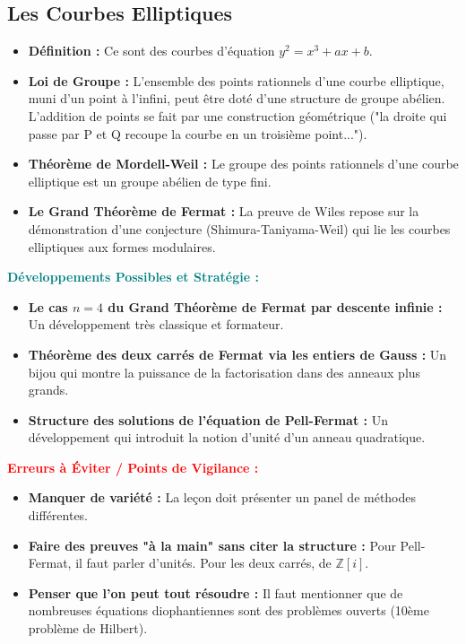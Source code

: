 \documentclass[12pt, a4paper, parskip=full]{report}
\theoremstyle{agregstyle}
\newenvironment{developpements}
  {\par\medskip\noindent\begin{oframed}\noindent\textbf{\textcolor{teal}{Développements Possibles et Stratégie :}}}
  {\end{oframed}\par\medskip}
\newenvironment{erreurs}
  {\par\medskip\noindent\begin{oframed}\noindent\textbf{\textcolor{red}{Erreurs à Éviter / Points de Vigilance :}}}
  {\end{oframed}\par\medskip}
\begin{document}
\subsection{Les Courbes Elliptiques}
\begin{itemize}
    \item \textbf{Définition :} Ce sont des courbes d'équation $y^2 = x^3+ax+b$.
    \item \textbf{Loi de Groupe :} L'ensemble des points rationnels d'une courbe elliptique, muni d'un point à l'infini, peut être doté d'une structure de groupe abélien. L'addition de points se fait par une construction géométrique ("la droite qui passe par P et Q recoupe la courbe en un troisième point...").
    \item \textbf{Théorème de Mordell-Weil :} Le groupe des points rationnels d'une courbe elliptique est un groupe abélien de type fini.
    \item \textbf{Le Grand Théorème de Fermat :} La preuve de Wiles repose sur la démonstration d'une conjecture (Shimura-Taniyama-Weil) qui lie les courbes elliptiques aux formes modulaires.
\end{itemize}

\begin{developpements}
    \begin{itemize}
        \item \textbf{Le cas $n=4$ du Grand Théorème de Fermat par descente infinie :} Un développement très classique et formateur.
        \item \textbf{Théorème des deux carrés de Fermat via les entiers de Gauss :} Un bijou qui montre la puissance de la factorisation dans des anneaux plus grands.
        \item \textbf{Structure des solutions de l'équation de Pell-Fermat :} Un développement qui introduit la notion d'unité d'un anneau quadratique.
    \end{itemize}
\end{developpements}

\begin{erreurs}
    \begin{itemize}
        \item \textbf{Manquer de variété :} La leçon doit présenter un panel de méthodes différentes.
        \item \textbf{Faire des preuves "à la main" sans citer la structure :} Pour Pell-Fermat, il faut parler d'unités. Pour les deux carrés, de $\mathbb{Z}[i]$.
        \item \textbf{Penser que l'on peut tout résoudre :} Il faut mentionner que de nombreuses équations diophantiennes sont des problèmes ouverts (10ème problème de Hilbert).
    \end{itemize}
\end{erreurs}
\end{document}
